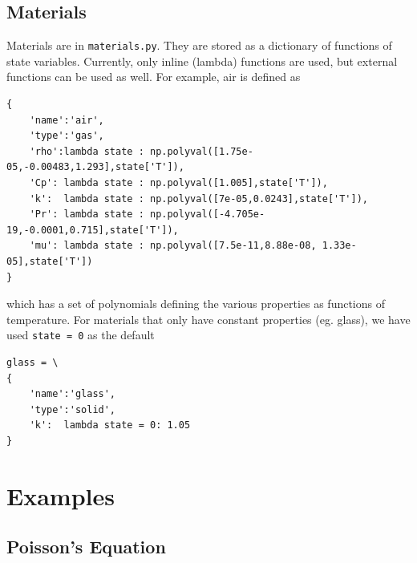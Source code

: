 \documentclass[11pt]{article}
\begin{document}
\subsection{Materials}
Materials are in \lstinline{materials.py}. They are stored as a dictionary of functions of state variables. Currently, only inline (lambda) functions are used, but external functions can be used as well. For example, air is defined as
\begin{lstlisting}
{
	'name':'air',
	'type':'gas',
	'rho':lambda state : np.polyval([1.75e-05,-0.00483,1.293],state['T']),
	'Cp': lambda state : np.polyval([1.005],state['T']),
	'k':  lambda state : np.polyval([7e-05,0.0243],state['T']),
	'Pr': lambda state : np.polyval([-4.705e-19,-0.0001,0.715],state['T']),
	'mu': lambda state : np.polyval([7.5e-11,8.88e-08, 1.33e-05],state['T'])
}
\end{lstlisting}
which has a set of polynomials defining the various properties as functions of temperature. For materials that only have constant properties (eg. glass), we have used \lstinline{state = 0} as the default\
\begin{lstlisting}
glass = \
{
	'name':'glass',
	'type':'solid',
	'k':  lambda state = 0: 1.05
}
\end{lstlisting}
\section{Examples}

\subsection{Poisson's Equation}
\end{document}
